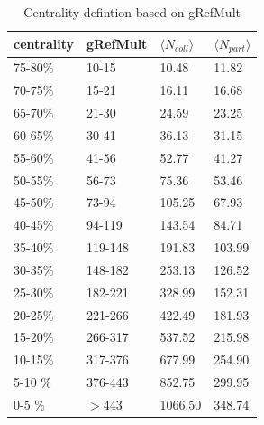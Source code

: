 \begin{table}[htp]
	\begin{center}
	\begin{tabular}{l|l|l|l}
  \toprule[1.6pt]
  \hline
  centrality & gRefMult & {$\langle$$N_{coll}$$\rangle$} & {$\langle$$N_{part}$$\rangle$} \\ \hline
  75-80$\%$ &	10-15	& 10.48 &	11.82 \\ \hline
	70-75$\%$ &	15-21	&	16.11 &	16.68 \\ \hline
	65-70$\%$ &	21-30	&	24.59 &	23.25 \\ \hline
	60-65$\%$ &	30-41	&	36.13 &	31.15 \\ \hline
	55-60$\%$ &	41-56	&	52.77 &	41.27 \\ \hline
	50-55$\%$ &	56-73	&	75.36 &	53.46 \\ \hline
  45-50$\%$ &	73-94	&	105.25 & 67.93 \\ \hline
  40-45$\%$ &	94-119 & 143.54 &	84.71 \\ \hline
  35-40$\%$ &	119-148	& 191.83 & 103.99 \\ \hline
	30-35$\%$ &	148-182	& 253.13 & 126.52 \\ \hline
	25-30$\%$ &	182-221	& 328.99 & 152.31 \\ \hline
	20-25$\%$ &	221-266	& 422.49 & 181.93 \\ \hline
	15-20$\%$ &	266-317	& 537.52 & 215.98 \\ \hline
	10-15$\%$ &	317-376	& 677.99 & 254.90 \\ \hline
	5-10 $\%$ &	376-443	& 852.75 & 299.95 \\ \hline
  0-5	 $\%$	& $>$443	& 1066.50	& 348.74 \\ \hline
  \hline
  \bottomrule[1.6pt]
	\end{tabular}
	\caption{Centrality defintion based on gRefMult}
	\label{centrality}
	\end{center}
\end{table}